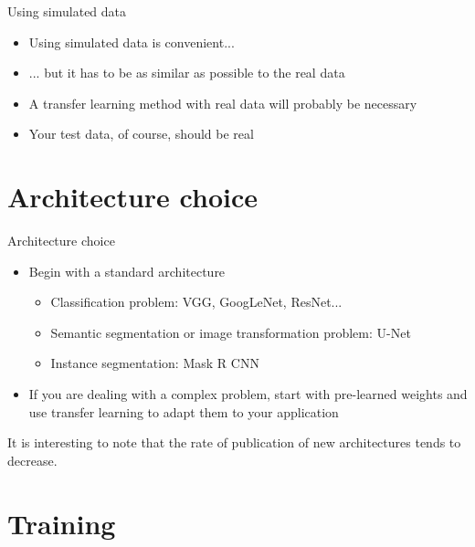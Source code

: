 \documentclass[xcolor=pdftex,dvipsnames,table,mathserif]{beamer}
\begin{document}
\begin{frame}{Using simulated data}

  \begin{itemize}[<+->]
  \item Using simulated data is convenient...
  \item ... but it has to be as similar as possible to the real data
  \item A transfer learning method with real data will probably be necessary
  \item Your test data, of course, should be real
  \end{itemize}

\end{frame}


\section{Architecture choice}

\begin{frame}{Architecture choice}

  \begin{itemize}[<+->]
  \item Begin with a standard architecture
    \begin{itemize}
    \item Classification problem: VGG, GoogLeNet, ResNet...
    \item Semantic segmentation or image transformation problem: U-Net
    \item Instance segmentation: Mask R CNN
    \end{itemize}
  \item If you are dealing with a complex problem, start with pre-learned weights and use transfer learning to adapt them to your application
  \end{itemize}

  \pause

  It is interesting to note that the rate of publication of new architectures tends to decrease.

\end{frame}


\section{Training}
\end{document}
